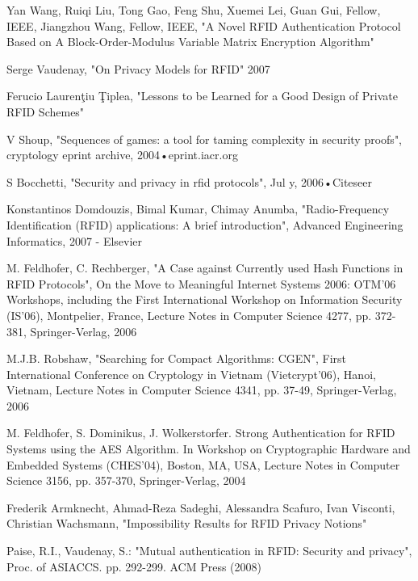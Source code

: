 \begin{thebibliography}{9}


Yan Wang, Ruiqi Liu, Tong Gao, Feng Shu, Xuemei Lei, Guan Gui, Fellow, IEEE, Jiangzhou
Wang, Fellow, IEEE, "A Novel RFID Authentication Protocol Based on A Block-Order-Modulus Variable Matrix Encryption Algorithm"

Serge Vaudenay, "On Privacy Models for RFID" 2007

Ferucio Laurenţiu Ţiplea, "Lessons to be Learned for a Good Design of Private RFID Schemes"

V Shoup, "Sequences of games: a tool for taming complexity in security proofs", cryptology eprint archive, 2004•eprint.iacr.org

S Bocchetti, "Security and privacy in rfid protocols", Jul y, 2006•Citeseer

Konstantinos Domdouzis, Bimal Kumar, Chimay Anumba, "Radio-Frequency Identification (RFID) applications: A brief introduction", Advanced Engineering Informatics, 2007 - Elsevier

M. Feldhofer, C. Rechberger, "A Case against Currently used Hash Functions in RFID Protocols", On the Move to Meaningful Internet Systems 2006: OTM'06 Workshops, including the First International Workshop on Information Security (IS'06), Montpelier, France, Lecture Notes in Computer Science 4277, pp. 372-381, Springer-Verlag, 2006

M.J.B. Robshaw, "Searching for Compact Algorithms: CGEN", First International Conference on Cryptology in Vietnam (Vietcrypt'06), Hanoi, Vietnam, Lecture Notes in Computer Science 4341, pp. 37-49, Springer-Verlag, 2006

M. Feldhofer, S. Dominikus, J. Wolkerstorfer. Strong Authentication for RFID Systems using the AES Algorithm. In Workshop on Cryptographic Hardware and Embedded Systems (CHES'04), Boston, MA, USA, Lecture Notes in Computer Science 3156, pp. 357-370, Springer-Verlag, 2004

Frederik Armknecht, Ahmad-Reza Sadeghi, Alessandra Scafuro, Ivan Visconti, Christian Wachsmann, "Impossibility Results for RFID Privacy Notions"

Paise, R.I., Vaudenay, S.: "Mutual authentication in RFID: Security and privacy", Proc. of ASIACCS. pp. 292-299. ACM Press (2008)

\end{thebibliography}